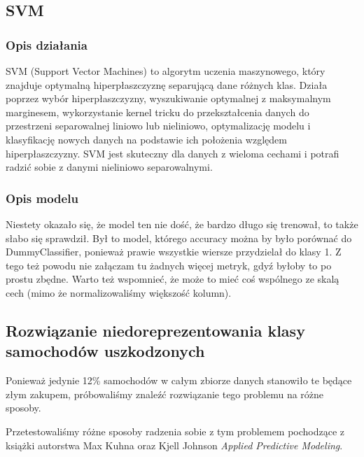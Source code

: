 \documentclass[11pt]{article}
\begin{document}
    \hypertarget{svm}{%
\subsection{SVM}\label{svm}}

\hypertarget{opis-dziaux142ania}{%
\subsubsection{Opis działania}\label{opis-dziaux142ania}}

SVM (Support Vector Machines) to algorytm uczenia maszynowego, który
znajduje optymalną hiperpłaszczyznę separującą dane różnych klas. Działa
poprzez wybór hiperpłaszczyzny, wyszukiwanie optymalnej z maksymalnym
marginesem, wykorzystanie kernel tricku do przekształcenia danych do
przestrzeni separowalnej liniowo lub nieliniowo, optymalizację modelu i
klasyfikację nowych danych na podstawie ich położenia względem
hiperpłaszczyzny. SVM jest skuteczny dla danych z wieloma cechami i
potrafi radzić sobie z danymi nieliniowo separowalnymi.

\hypertarget{opis-modelu}{%
\subsubsection{Opis modelu}\label{opis-modelu}}

Niestety okazało się, że model ten nie dość, że bardzo długo się
trenował, to także słabo się sprawdził. Był to model, którego accuracy
można by było porównać do DummyClassifier, ponieważ prawie wszystkie
wiersze przydzielał do klasy 1. Z tego też powodu nie załączam tu
żadnych więcej metryk, gdyź byłoby to po prostu zbędne. Warto też
wspomnieć, że może to mieć coś wspólnego ze skalą cech (mimo że
normalizowaliśmy większość kolumn).

    \hypertarget{rozwiux105zanie-niedoreprezentowania-klasy-samochoduxf3w-uszkodzonych}{%
\subsection{Rozwiązanie niedoreprezentowania klasy samochodów
uszkodzonych}\label{rozwiux105zanie-niedoreprezentowania-klasy-samochoduxf3w-uszkodzonych}}

Ponieważ jedynie 12\% samochodów w całym zbiorze danych stanowiło te
będące złym zakupem, próbowaliśmy znaleźć rozwiązanie tego problemu na
różne sposoby.

Przetestowaliśmy różne sposoby radzenia sobie z tym problemem pochodzące
z książki autorstwa Max Kuhna oraz Kjell Johnson \emph{Applied
Predictive Modeling}.
\end{document}
